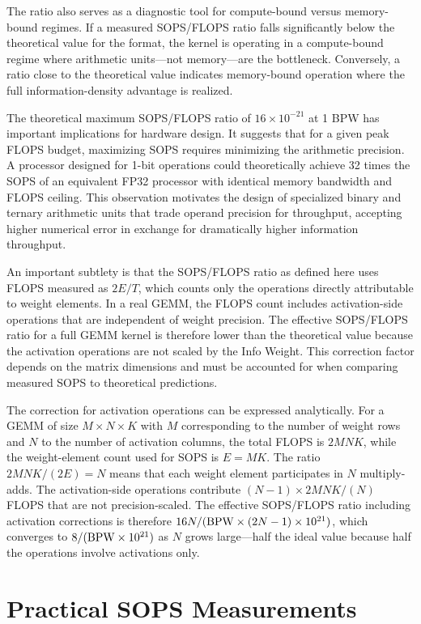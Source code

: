 The ratio also serves as a diagnostic tool for compute-bound versus memory-bound regimes. If a measured SOPS/FLOPS ratio falls significantly below the theoretical value for the format, the kernel is operating in a compute-bound regime where arithmetic units---not memory---are the bottleneck. Conversely, a ratio close to the theoretical value indicates memory-bound operation where the full information-density advantage is realized.

The theoretical maximum SOPS/FLOPS ratio of $16 \times 10^{-21}$ at 1 BPW has important implications for hardware design. It suggests that for a given peak FLOPS budget, maximizing SOPS requires minimizing the arithmetic precision. A processor designed for 1-bit operations could theoretically achieve 32 times the SOPS of an equivalent FP32 processor with identical memory bandwidth and FLOPS ceiling. This observation motivates the design of specialized binary and ternary arithmetic units that trade operand precision for throughput, accepting higher numerical error in exchange for dramatically higher information throughput.

An important subtlety is that the SOPS/FLOPS ratio as defined here uses FLOPS measured as $2E/T$, which counts only the operations directly attributable to weight elements. In a real GEMM, the FLOPS count includes activation-side operations that are independent of weight precision. The effective SOPS/FLOPS ratio for a full GEMM kernel is therefore lower than the theoretical value because the activation operations are not scaled by the Info Weight. This correction factor depends on the matrix dimensions and must be accounted for when comparing measured SOPS to theoretical predictions.

The correction for activation operations can be expressed analytically. For a GEMM of size $M \times N \times K$ with $M$ corresponding to the number of weight rows and $N$ to the number of activation columns, the total FLOPS is $2MNK$, while the weight-element count used for SOPS is $E = MK$. The ratio $2MNK / (2E) = N$ means that each weight element participates in $N$ multiply-adds. The activation-side operations contribute $(N - 1) \times 2MNK / (N)$ FLOPS that are not precision-scaled. The effective SOPS/FLOPS ratio including activation corrections is therefore $16N / (\textnormal{BPW} \times (2N - 1) \times 10^{21})$, which converges to $8 / (\textnormal{BPW} \times 10^{21})$ as $N$ grows large---half the ideal value because half the operations involve activations only.

\section{Practical SOPS Measurements}
\label{sec:practical_measurements}

